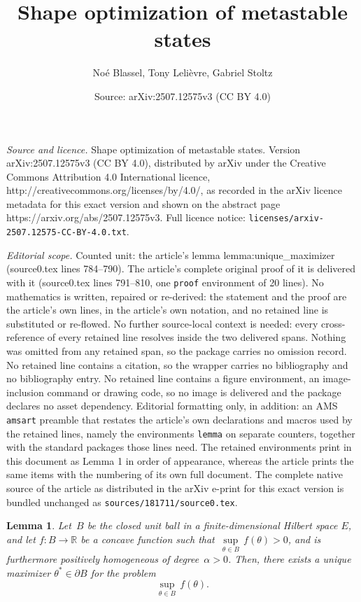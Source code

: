 \documentclass[10pt,a4paper]{amsart}
\title{Shape optimization of metastable states}
\author{No\'e Blassel, Tony Leli\`evre, Gabriel Stoltz}
\date{Source: arXiv:2507.12575v3 (CC BY 4.0)}
\newtheorem{lemma}{Lemma}
\newcommand{\R}{\mathbb{R}}
\begin{document}
\maketitle

\noindent\emph{Source and licence.} Shape optimization of metastable states. Version arXiv:2507.12575v3 (CC BY 4.0), distributed by arXiv under the Creative Commons Attribution 4.0 International licence, http://creativecommons.org/licenses/by/4.0/, as recorded in the arXiv licence metadata for this exact version and shown on the abstract page https://arxiv.org/abs/2507.12575v3. Full licence notice: \texttt{licenses/arxiv-2507.12575-CC-BY-4.0.txt}.\par\smallskip

\noindent\textit{Editorial scope.} Counted unit: the article's lemma lemma:unique\_maximizer (source0.tex lines 784--790). The article's complete original proof of it is delivered with it (source0.tex lines 791--810, one \texttt{proof} environment of 20 lines). No mathematics is written, repaired or re-derived: the statement and the proof are the article's own lines, in the article's own notation, and no retained line is substituted or re-flowed.  No further source-local context is needed: every cross-reference of every retained line resolves inside the two delivered spans.  Nothing was omitted from any retained span, so the package carries no omission record.  No retained line contains a citation, so the wrapper carries no bibliography and no bibliography entry.  No retained line contains a figure environment, an image-inclusion command or drawing code, so no image is delivered and the package declares no asset dependency.  Editorial formatting only, in addition: an AMS \texttt{amsart} preamble that restates the article's own declarations and macros used by the retained lines, namely the environments \texttt{lemma} on separate counters, together with the standard packages those lines need.  The retained environments print in this document as Lemma 1 in order of appearance, whereas the article prints the same items with the numbering of its own full document.  The complete native source of the article as distributed in the arXiv e-print for this exact version is bundled unchanged as \texttt{sources/181711/source0.tex}.
\begin{lemma}
    \label{lemma:unique_maximizer}
    Let~$B$ be the closed unit ball in a finite-dimensional Hilbert space $E$, and let $f:B\to\R$ be a concave function such that~$\underset{\theta\in B}{\sup}\, f(\theta)>0$, and is furthermore positively homogeneous of degree~$\alpha>0$. Then, there exists a unique maximizer $\theta^*\in \partial B$ for the problem
    \begin{equation}
        \underset{\theta\in B}{\sup}\,f(\theta).
    \end{equation}
\end{lemma}
\end{document}

